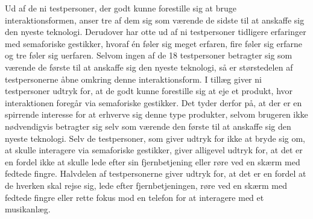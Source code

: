 Ud af de ni testpersoner, der godt kunne forestille sig at bruge interaktionsformen, anser tre af dem sig som værende de sidste til at anskaffe sig den nyeste teknologi. Derudover har otte ud af ni testpersoner tidligere erfaringer med semaforiske gestikker, hvoraf én føler sig meget erfaren, fire føler sig erfarne og tre føler sig uerfaren. Selvom ingen af de 18 testpersoner betragter sig som værende de første til at anskaffe sig den nyeste teknologi, så er størstedelen af testpersonerne åbne omkring denne interaktionsform. I tillæg giver ni testpersoner udtryk for, at de godt kunne forestille sig at eje et produkt, hvor interaktionen foregår via semaforiske gestikker. Det tyder derfor på, at der er en spirrende interesse for at erhverve sig denne type produkter, selvom brugeren ikke nødvendigvis betragter sig selv som værende den første til at anskaffe sig den nyeste teknologi. Selv de testpersoner, som giver udtryk for ikke at bryde sig om, at skulle interagere via semaforiske gestikker, giver alligevel udtryk for, at det er en fordel ikke at skulle lede efter sin fjernbetjening eller røre ved en skærm med fedtede fingre. Halvdelen af testpersonerne giver udtryk for, at det er en fordel at de hverken skal rejse sig, lede efter fjernbetjeningen, røre ved en skærm med fedtede fingre eller rette fokus mod en telefon for at interagere med et musikanlæg.

